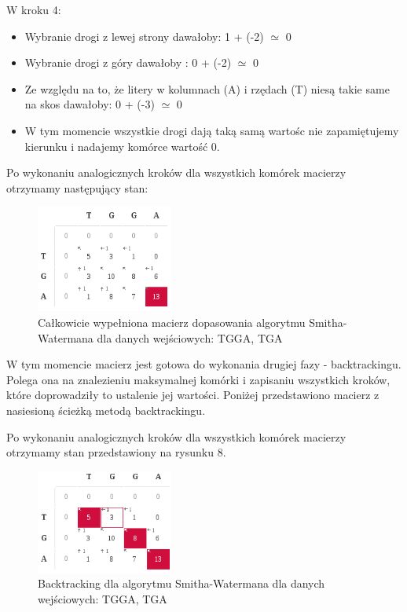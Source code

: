 \documentclass[a4paper,12pt]{article}
\newenvironment{lista}{
\begin{itemize}
  \setlength{\itemsep}{1pt}
  \setlength{\parskip}{0pt}
  \setlength{\parsep}{0pt}
}{\end{itemize}}
\begin{document}
W kroku 4:
\begin{lista}
\item Wybranie drogi z lewej strony dawałoby: 1 + (-2) $\simeq$ 0
\item Wybranie drogi z góry dawałoby : 0 + (-2) $\simeq$ 0
\item Ze względu na to, że litery w kolumnach (A) i rzędach (T) niesą takie same na skos dawałoby: 0 + (-3) $\simeq$ 0
\item W tym momencie wszystkie drogi dają taką samą wartośc nie zapamiętujemy kierunku i nadajemy komórce wartość 0.
\end{lista}


Po wykonaniu analogicznych kroków dla wszystkich komórek macierzy otrzymamy następujący stan:
\begin{figure}[H]
  \vspace{5pt}
  \centering
  \begin{center}
  \includegraphics[width=0.4\textwidth]{images/SchematDzialaniaAlgorytmuPelnaMacierz.png}
  \end{center}
  \caption{Całkowicie wypełniona macierz dopasowania algorytmu Smitha-Watermana dla danych wejściowych: TGGA, TGA}
 \end{figure}


W tym momencie macierz jest gotowa do wykonania drugiej fazy - backtrackingu. Polega ona na znalezieniu maksymalnej komórki i zapisaniu wszystkich kroków, które doprowadziły to ustalenie jej wartości. Poniżej przedstawiono macierz z nasiesioną ścieżką metodą backtrackingu. 

Po wykonaniu analogicznych kroków dla wszystkich komórek macierzy otrzymamy stan przedstawiony na rysunku 8.
\begin{figure}[H]
  \vspace{5pt}
  \centering
  \begin{center}
  \includegraphics[width=0.4\textwidth]{images/SchematDzialaniaAlgorytmuPelnaMacierzBacktracking.png}
  \end{center}
  \caption{Backtracking dla algorytmu Smitha-Watermana dla danych wejściowych: TGGA, TGA}
 \end{figure}
\end{document}
